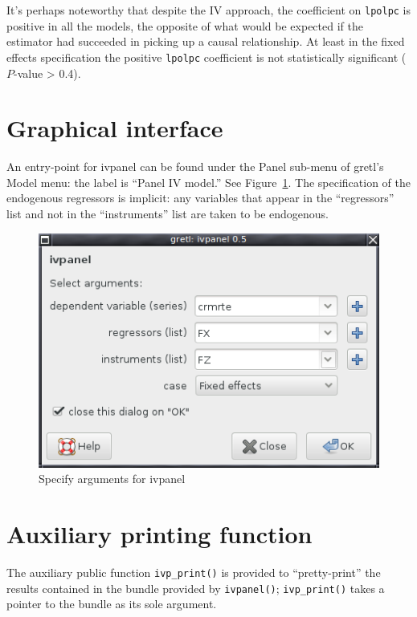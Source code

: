 \documentclass{article}
\begin{document}
It's perhaps noteworthy that despite the IV approach, the coefficient
on \texttt{lpolpc} is positive in all the models, the opposite of what
would be expected if the estimator had succeeded in picking up a
causal relationship. At least in the fixed effects specification the
positive \texttt{lpolpc} coefficient is not statistically significant
($P$-value > 0.4).

\section{Graphical interface}

An entry-point for \textsf{ivpanel} can be found under the
\textsf{Panel} sub-menu of gretl's \textsf{Model} menu: the label is
``Panel IV model.'' See Figure~\ref{fig:gui}. The specification of the
endogenous regressors is implicit: any variables that appear in the
``regressors'' list and not in the ``instruments'' list are taken to
be endogenous.

\begin{figure}[htbp]
  \centering
  \includegraphics[scale=0.6]{ivpanel-gui}
  \caption{Specify arguments for ivpanel}
  \label{fig:gui}
\end{figure}

\section{Auxiliary printing function}

The auxiliary public function \texttt{ivp\_print()} is provided to
``pretty-print'' the results contained in the bundle provided by
\texttt{ivpanel()}; \texttt{ivp\_print()} takes a pointer to the
bundle as its sole argument.



\end{document}
